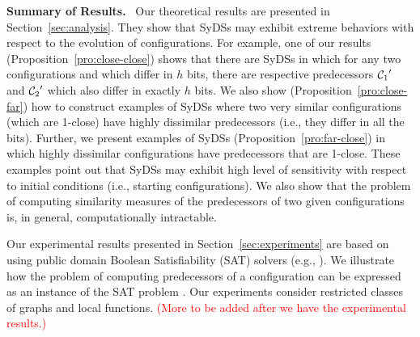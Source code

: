 \noindent
\textbf{Summary of Results.}~ 
Our theoretical results are presented in Section~\ref{sec:analysis}.
They  show that SyDSs may exhibit
extreme behaviors with respect to the evolution of configurations.
For example, one of our results (Proposition~\ref{pro:close-close})  
shows that there are SyDSs in which
for any two configurations \calcone{} and \calctwo{} 
which differ in $h$ bits, there are respective predecessors 
$\mbox{$\mathcal{C}_{1}$}'$ and $\mbox{$\mathcal{C}_{2}$}'$ which also differ in exactly $h$ bits.
We also show (Proposition~\ref{pro:close-far})
how to construct examples of SyDSs where two very similar 
configurations (which are 1-close) have highly dissimilar predecessors
(i.e., they differ in all the bits).
Further, we present examples of SyDSs (Proposition~\ref{pro:far-close})
in which highly dissimilar configurations have predecessors that are 1-close.
These examples point out that SyDSs may exhibit high level of sensitivity
with respect to initial conditions (i.e., starting configurations).
We also show that the problem of computing similarity
measures of the predecessors of two given configurations 
is, in general, computationally intractable.

Our experimental results presented in Section~\ref{sec:experiments}
are based on using public domain Boolean Satisfiability
(SAT) solvers (e.g., \cite{sat-live}).
We illustrate how the problem of computing predecessors of a
configuration can be expressed as an instance of the SAT
problem \cite{GJ-1979}.
Our experiments consider restricted classes of graphs and local functions.
\textcolor{red}{(More to be added after we have the experimental results.)}

\smallskip

